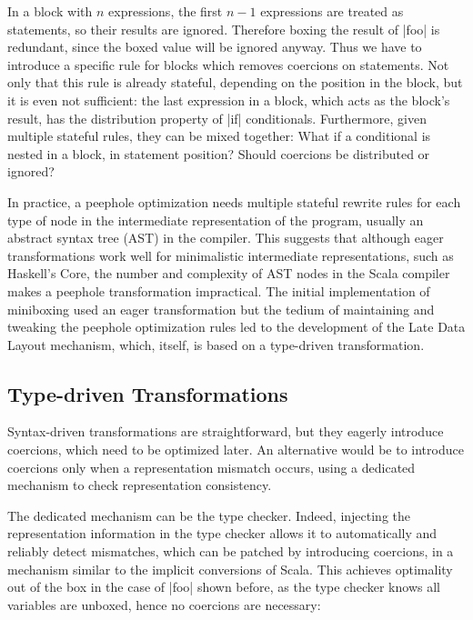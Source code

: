 In a block with $n$ expressions, the first $n-1$ expressions are treated as statements, so their results are ignored. Therefore boxing the result of |foo| is redundant, since the boxed value will be ignored anyway. Thus we have to introduce a specific rule for blocks which removes coercions on statements. Not only that this rule is already stateful, depending on the position in the block, but it is even not sufficient: the last expression in a block, which acts as the block's result, has the distribution property of |if| conditionals. Furthermore, given multiple stateful rules, they can be mixed together: What if a conditional is nested in a block, in statement position? Should coercions be distributed or ignored?

In practice, a peephole optimization needs multiple stateful rewrite rules for each type of node in the intermediate representation of the program, usually an abstract syntax tree (AST) in the compiler. This suggests that although eager transformations work well for minimalistic intermediate representations, such as Haskell's Core, the number and complexity of AST nodes in the Scala compiler makes a peephole transformation impractical. The initial implementation of miniboxing \cite{miniboxing} used an eager transformation but the tedium of maintaining and tweaking the peephole optimization rules led to the development of the Late Data Layout mechanism, which, itself, is based on a type-driven transformation.

\subsection{Type-driven Transformations}
\label{ldl:sec:problem/lazy}

Syntax-driven transformations are straightforward, but they eagerly introduce coercions, which need to be optimized later. An alternative would be to introduce coercions only when a representation mismatch occurs, using a dedicated mechanism to check representation consistency.

The dedicated mechanism can be the type checker. Indeed, injecting the representation information in the type checker allows it to automatically and reliably detect mismatches, which can be patched by introducing coercions, in a mechanism similar to the implicit conversions of Scala. This achieves optimality out of the box in the case of |foo| shown before, as the type checker knows all variables are unboxed, hence no coercions are necessary:

